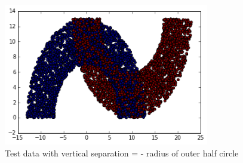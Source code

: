 \documentclass[paper=a4, fontsize=11pt]{scrartcl} %
\numberwithin{equation}{section} %
\numberwithin{figure}{section} %
\numberwithin{table}{section} %
\begin{document}
\begin{figure}[H]
	\centering
  \includegraphics[width=0.8\textwidth]{samples_4.png}
	\caption{Test data with vertical separation = - radius of outer half circle}
	\label{fig_s4}
\end{figure}
\end{document}
